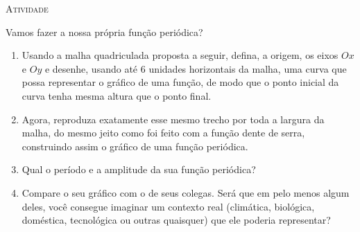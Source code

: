 \documentclass[10 pt,usenames,dvipsnames, oneside]{article}
\begin{document}
\bigskip
\begin{center}
{\large \scshape Atividade}
\end{center}
\fi

Vamos fazer a nossa própria função periódica?

\begin{enumerate}
\item Usando a malha quadriculada proposta a seguir, defina, a origem, os eixos $Ox$ e $Oy$ e desenhe, usando até $6$ unidades horizontais da malha, uma curva que possa representar o gráfico de uma função, de modo que o ponto inicial da curva tenha mesma altura que o ponto final.
\item Agora, reproduza exatamente esse mesmo trecho por toda a largura da malha, do mesmo jeito como foi feito com a função dente de serra, construindo assim o gráfico de uma função periódica.
\item Qual o período e a amplitude da sua função periódica?
\item Compare o seu gráfico com o de seus colegas. Será que em pelo menos algum deles, você consegue imaginar um contexto real (climática, biológica, doméstica, tecnológica ou outras quaisquer) que ele poderia representar?

\end{enumerate}


\begin{figure}[H]
\centering



\end{figure}



\end{document}
